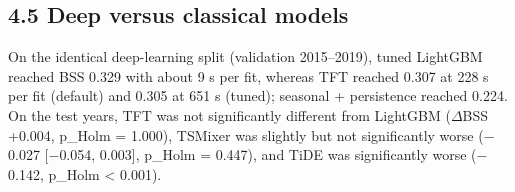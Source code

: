 \documentclass[
]{article}
\begin{document}
\begin{landscape}
\footnotesize\setlength{\tabcolsep}{2pt}

\normalsize
\end{landscape}

\begin{landscape}
\footnotesize\setlength{\tabcolsep}{2pt}

\normalsize
\end{landscape}

\hypertarget{deep-versus-classical-models}{%
\subsection{4.5 Deep versus classical models}\label{deep-versus-classical-models}}

On the identical deep-learning split (validation 2015--2019), tuned LightGBM reached BSS 0.329 with about 9 s per fit, whereas TFT reached 0.307 at 228 s per fit (default) and 0.305 at 651 s (tuned); seasonal + persistence reached 0.224.  %
On the test years, TFT was not significantly different from LightGBM ($\Delta$BSS +0.004, p\_Holm = 1.000), TSMixer was slightly but not significantly worse ($-$0.027 {[}$-$0.054, 0.003{]}, p\_Holm = 0.447), and TiDE was significantly worse ($-$0.142, p\_Holm \textless{} 0.001).  %
\end{document}
